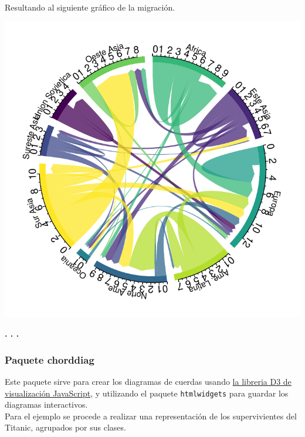 \documentclass{article}\usepackage[]{graphicx}\usepackage[]{color}
\makeatletter
\def\maxwidth{ %
  \ifdim\Gin@nat@width>\linewidth
    \linewidth
  \else
    \Gin@nat@width
  \fi
}
\newenvironment{knitrout}{}{} %
\makeatother
\begin{document}
\clearpage
Resultando al siguiente gr\'afico de la migraci\'on.
\begin{knitrout}
\color{fgcolor}

{\centering \includegraphics[width=\maxwidth]{figure/plot-1} 

}



\end{knitrout}
\begin{center}
\textbf{. . .}
\end{center}
\subsubsection{Paquete chorddiag}
Este paquete %
sirve para crear los diagramas de cuerdas usando \href{https://d3js.org/}{la libreria D3 de visualizaci\'on JavaScript}, y utilizando el paquete \texttt{htmlwidgets} para guardar los diagramas interactivos.~\\
Para el ejemplo se procede a realizar una representaci\'on de los supervivientes del Titanic, agrupados por sus clases.~\\
\end{document}
